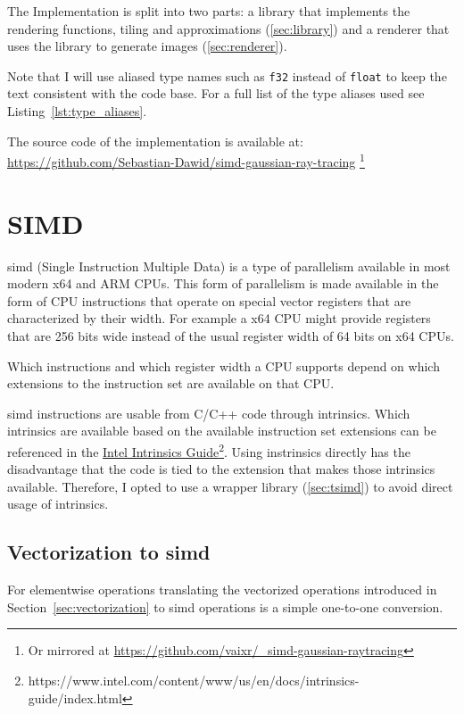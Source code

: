 \documentclass[a4paper, 11pt]{memoir}
\begin{document}
    The Implementation is split into two parts: a library that implements the rendering functions, tiling and approximations
    (\ref{sec:library}) and a renderer that uses the library to generate images (\ref{sec:renderer}).

    Note that I will use aliased type names such as \texttt{f32} instead of \texttt{float} to keep the
    text consistent with the code base. For a full list of the type aliases used see Listing~\ref{lst:type_aliases}.

    The source code of the implementation is available at: \\
    \href{https://github.com/Sebastian-Dawid/simd-gaussian-ray-tracing}{https://github.com/Sebastian-Dawid/simd-gaussian-ray-tracing}
    \footnote{Or mirrored at \href{https://github.com/vaixr/_simd-gaussian-raytracing}{https://github.com/vaixr/\_simd-gaussian-raytracing}}

    \section{SIMD}
    \label{sec:simd}
    \gls{simd} (Single Instruction Multiple Data) is a type of parallelism available in most modern x64 and ARM CPUs. This
    form of parallelism is made available in the form of CPU instructions that operate on special vector registers that
    are characterized by their width. For example a x64 CPU might provide registers that are 256 bits wide instead of
    the usual register width of 64 bits on x64 CPUs.

    Which instructions and which register width a CPU supports depend on which extensions to the instruction set are
    available on that CPU.

    \gls{simd} instructions are usable from C/C++ code through intrinsics. Which intrinsics are available based on the
    available instruction set extensions can be referenced in the
    \href{https://www.intel.com/content/www/us/en/docs/intrinsics-guide/index.html}{Intel Intrinsics
    Guide}\footnote{https://www.intel.com/content/www/us/en/docs/intrinsics-guide/index.html}. Using instrinsics
    directly has the disadvantage that the code is tied to the extension that makes those intrinsics available.
    Therefore, I opted to use a wrapper library (\ref{sec:tsimd}) to avoid direct usage of intrinsics.

    \subsection{Vectorization to \gls{simd}}
    \label{sec:vectorization_to_simd}
    For elementwise operations translating the vectorized operations introduced in Section~\ref{sec:vectorization} to
    \gls{simd} operations is a simple one-to-one conversion.
\end{document}
